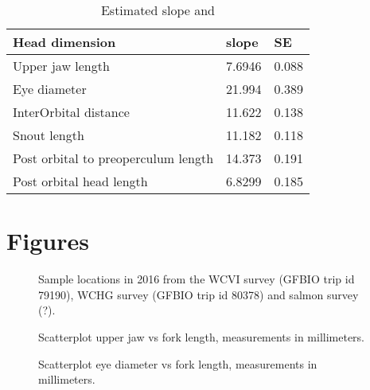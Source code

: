 \documentclass[12pt]{article}\usepackage[]{graphicx}\usepackage[]{color}
\begin{document}
\begin{table}

\caption{\label{tab:table5}Estimated slope and}
\fontsize{10}{12}\selectfont
\begin{tabular}[t]{lll}
\toprule
\textbf{Head dimension} & \textbf{slope} & \textbf{SE}\\
\midrule
Upper jaw length & 7.6946 & 0.088\\
Eye diameter & 21.994 & 0.389\\
InterOrbital distance & 11.622 & 0.138\\
Snout length & 11.182 & 0.118\\
Post orbital to preoperculum length & 14.373 & 0.191\\
Post orbital head length & 6.8299 & 0.185\\
\bottomrule
\end{tabular}
\end{table}
\clearpage

\hypertarget{figures}{%
\section{Figures}\label{figures}}


\begin{figure}[htb]

{\centering {} 

}

\caption{Sample locations in 2016 from the WCVI survey (GFBIO trip id 79190), WCHG survey (GFBIO trip id 80378) and salmon survey (?).}\label{fig:figure1}
\end{figure}

\begin{figure}[htb]

{\centering {} 

}

\caption{Scatterplot upper jaw vs fork length, measurements in millimeters.}\label{fig:figure2}
\end{figure}

\begin{figure}[htb]

{\centering {} 

}

\caption{Scatterplot eye diameter vs fork length, measurements in millimeters.}\label{fig:figure3}
\end{figure}
\end{document}
